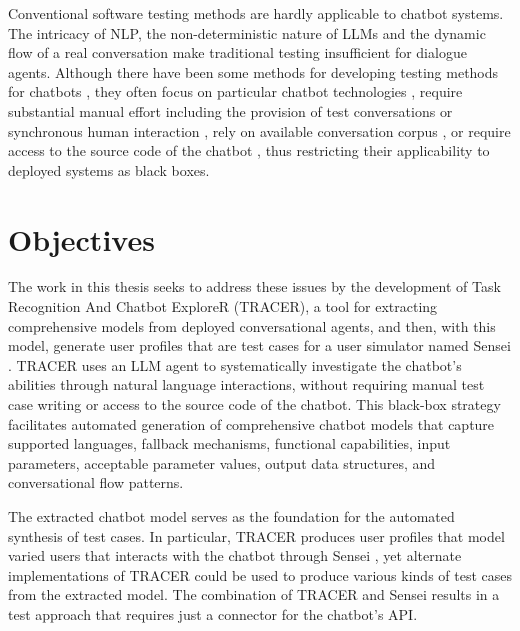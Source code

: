Conventional software testing methods are hardly applicable to chatbot systems.
The intricacy of \ac{NLP}, the non-deterministic nature of \acp{LLM} and the dynamic flow of a real conversation make traditional testing insufficient for dialogue agents.
Although there have been some methods for developing testing methods for chatbots \cite{cuadradoIntegratingStaticQuality2024, canizaresMeasuringClusteringHeterogeneous2024}, they often focus on particular chatbot technologies \autocite{RasaTest2025}, require substantial manual effort including the provision of test conversations \autocite{CyaraBotium, RasaTest2025} or synchronous human interaction \autocite{renEvaluationTechniquesChatbot2019}, rely on available conversation corpus \autocite{vasconcelosBottesterTestingConversational2017}, or require access to the source code of the chatbot \autocite{canizaresCoveragebasedStrategiesAutomated2024, gomez-abajoMutationTestingTaskOriented2024, urricoMutaBotMutationTesting2024}, thus restricting their applicability to deployed systems as black boxes.

\section{Objectives}

The work in this thesis seeks to address these issues by the development of Task Recognition And Chatbot ExploreR (\ac{TRACER}), a tool for extracting comprehensive models from deployed conversational agents, and then, with this model, generate user profiles that are test cases for a user simulator named Sensei \autocite{delaraAutomatedEndtoEndTesting2025, delaraSensei}.
\ac{TRACER} uses an \ac{LLM} agent to systematically investigate the chatbot's abilities through natural language interactions, without requiring manual test case writing or access to the source code of the chatbot.
This black-box strategy facilitates automated generation of comprehensive chatbot models that capture supported languages, fallback mechanisms, functional capabilities, input parameters, acceptable parameter values, output data structures, and conversational flow patterns.


The extracted chatbot model serves as the foundation for the automated synthesis of test cases.
In particular, \ac{TRACER} produces user profiles that model varied users that interacts with the chatbot through Sensei \autocite{delaraAutomatedEndtoEndTesting2025, delaraSensei}, yet alternate implementations of \ac{TRACER} could be used to produce various kinds of test cases from the extracted model.
The combination of \ac{TRACER} and Sensei results in a test approach that requires just a connector for the chatbot’s API.

